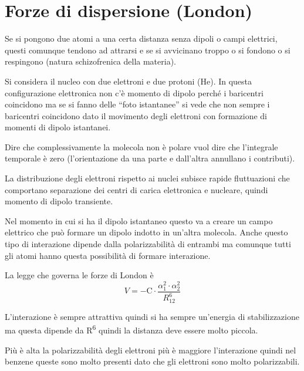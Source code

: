 \section{Forze di dispersione (London)}

Se si pongono due atomi a una certa distanza senza dipoli o campi
elettrici, questi comunque tendono ad attrarsi e se si avvicinano troppo
o si fondono o si respingono (natura schizofrenica della materia).

Si considera il nucleo con due elettroni e due protoni (He).
In questa configurazione elettronica non c'è momento di dipolo perché i
baricentri coincidono ma se si fanno delle ``foto istantanee'' si vede
che non sempre i baricentri coincidono dato il movimento degli elettroni
con formazione di momenti di dipolo istantanei.

Dire che complessivamente la molecola non è polare vuol dire che
l'integrale temporale è zero (l'orientazione da una parte e dall'altra
annullano i contributi).

La distribuzione degli elettroni rispetto ai nuclei subisce rapide
fluttuazioni che comportano separazione dei centri di carica elettronica
e nucleare, quindi momento di dipolo transiente.

Nel momento in cui si ha il dipolo istantaneo questo va a creare un
campo elettrico che può formare un dipolo indotto in un'altra molecola.
Anche questo tipo di interazione dipende dalla polarizzabilità di
entrambi ma comunque tutti gli atomi hanno questa possibilità di formare
interazione.



La legge che governa le forze di London è
\[
  V = -\text{C} \cdot \frac{\alpha_1^2 \cdot \alpha_2^2}{R_{12}^6}
\]

L'interazione
è sempre attrattiva quindi si ha sempre un'energia di stabilizzazione ma
questa dipende da R\textsuperscript{6} quindi la distanza deve essere
molto piccola.


Più è alta la polarizzabilità degli elettroni più è maggiore
l'interazione quindi nel benzene queste sono molto presenti dato che gli
elettroni sono molto polarizzabili.


